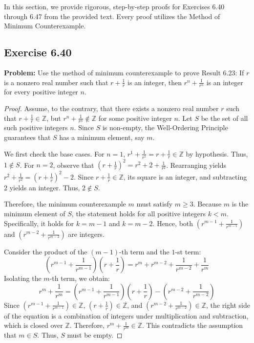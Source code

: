 \documentclass[11pt, a4paper]{article}
\theoremstyle{definition}
\theoremstyle{remark}
\newcommand{\Z}{\mathbb{Z}}
\begin{document}
In this section, we provide rigorous, step-by-step proofs for Exercises 6.40 through 6.47 from the provided text. Every proof utilizes the Method of Minimum Counterexample.

\subsection{Exercise 6.40}
\textbf{Problem:} Use the method of minimum counterexample to prove Result 6.23: If $r$ is a nonzero real number such that $r + \frac{1}{r}$ is an integer, then $r^n + \frac{1}{r^n}$ is an integer for every positive integer $n$.

\begin{proof}
Assume, to the contrary, that there exists a nonzero real number $r$ such that $r + \frac{1}{r} \in \Z$, but $r^n + \frac{1}{r^n} \notin \Z$ for some positive integer $n$. Let $S$ be the set of all such positive integers $n$. Since $S$ is non-empty, the Well-Ordering Principle guarantees that $S$ has a minimum element, say $m$. 

We first check the base cases. 
For $n=1$, $r^1 + \frac{1}{r^1} = r + \frac{1}{r} \in \Z$ by hypothesis. Thus, $1 \notin S$.
For $n=2$, observe that $\left(r + \frac{1}{r}\right)^2 = r^2 + 2 + \frac{1}{r^2}$. Rearranging yields $r^2 + \frac{1}{r^2} = \left(r + \frac{1}{r}\right)^2 - 2$. Since $r + \frac{1}{r} \in \Z$, its square is an integer, and subtracting $2$ yields an integer. Thus, $2 \notin S$.

Therefore, the minimum counterexample $m$ must satisfy $m \ge 3$. Because $m$ is the minimum element of $S$, the statement holds for all positive integers $k < m$. Specifically, it holds for $k = m-1$ and $k = m-2$. Hence, both $\left(r^{m-1} + \frac{1}{r^{m-1}}\right)$ and $\left(r^{m-2} + \frac{1}{r^{m-2}}\right)$ are integers.

Consider the product of the $(m-1)$-th term and the $1$-st term:
\[
\left(r^{m-1} + \frac{1}{r^{m-1}}\right)\left(r + \frac{1}{r}\right) = r^m + r^{m-2} + \frac{1}{r^{m-2}} + \frac{1}{r^m}
\]
Isolating the $m$-th term, we obtain:
\[
r^m + \frac{1}{r^m} = \left(r^{m-1} + \frac{1}{r^{m-1}}\right)\left(r + \frac{1}{r}\right) - \left(r^{m-2} + \frac{1}{r^{m-2}}\right)
\]
Since $\left(r^{m-1} + \frac{1}{r^{m-1}}\right) \in \Z$, $\left(r + \frac{1}{r}\right) \in \Z$, and $\left(r^{m-2} + \frac{1}{r^{m-2}}\right) \in \Z$, the right side of the equation is a combination of integers under multiplication and subtraction, which is closed over $\Z$. Therefore, $r^m + \frac{1}{r^m} \in \Z$. This contradicts the assumption that $m \in S$. Thus, $S$ must be empty.
\end{proof}
\end{document}
